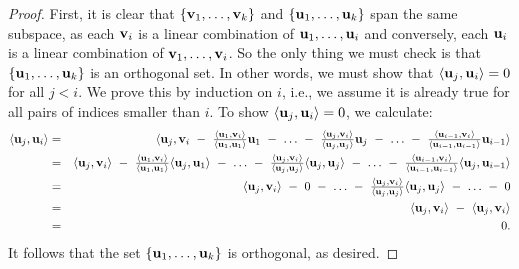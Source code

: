 \begin{proof}
  First, it is clear that $\set{\vect{v}_1,\ldots,\vect{v}_k}$ and
  $\set{\vect{u}_1,\ldots,\vect{u}_k}$ span the same subspace, as each
  $\vect{v}_i$ is a linear combination of
  $\vect{u}_1,\ldots,\vect{u}_i$ and conversely, each $\vect{u}_i$ is
  a linear combination of $\vect{v}_1,\ldots,\vect{v}_i$. So the only
  thing we must check is that $\set{\vect{u}_1,\ldots,\vect{u}_k}$ is
  an orthogonal set. In other words, we must show that
  $\iprod{\vect{u}_j,\vect{u}_i}=0$ for all $j<i$. We prove this by
  induction on $i$, i.e., we assume it is already true for all pairs
  of indices smaller than $i$. To show
  $\iprod{\vect{u}_j,\vect{u}_i}=0$, we calculate:
  \begin{eqnarray*}
    \iprod{\vect{u}_j,\vect{u}_i}
    &=& \textstyle
        \iprod{\vect{u}_j, \vect{v}_i
        ~-~ \frac{\iprod{\vect{u}_1,\vect{v}_i}}{\iprod{\vect{u}_1,\vect{u}_1}}\vect{u}_1
        ~-~ \ldots
        ~-~ \frac{\iprod{\vect{u}_j,\vect{v}_i}}{\iprod{\vect{u}_j,\vect{u}_j}}\vect{u}_j
        ~-~ \ldots
        ~-~ \frac{\iprod{\vect{u}_{i-1},\vect{v}_i}}{\iprod{\vect{u}_{i-1},\vect{u}_{i-1}}}\vect{u}_{i-1}}
    \\
    &=& \textstyle
        \iprod{\vect{u}_j, \vect{v}_i}
        ~-~ \frac{\iprod{\vect{u}_1,\vect{v}_i}}{\iprod{\vect{u}_1,\vect{u}_1}}\iprod{\vect{u}_j,\vect{u}_1}
        ~-~ \ldots
        ~-~ \frac{\iprod{\vect{u}_j,\vect{v}_i}}{\iprod{\vect{u}_j,\vect{u}_j}}\iprod{\vect{u}_j,\vect{u}_j}
        ~-~ \ldots
        ~-~ \frac{\iprod{\vect{u}_{i-1},\vect{v}_i}}{\iprod{\vect{u}_{i-1},\vect{u}_{i-1}}}\iprod{\vect{u}_j,\vect{u}_{i-1}}
    \\
    &=& \textstyle
        \iprod{\vect{u}_j, \vect{v}_i}
        ~-~ 0
        ~-~ \ldots
        ~-~ \frac{\iprod{\vect{u}_j,\vect{v}_i}}{\iprod{\vect{u}_j,\vect{u}_j}}\iprod{\vect{u}_j,\vect{u}_j}
        ~-~ \ldots
        ~-~ 0
    \\
    &=& \iprod{\vect{u}_j, \vect{v}_i}
        ~-~ \iprod{\vect{u}_j,\vect{v}_i}
    \\
    &=& 0.
  \end{eqnarray*}
  It follows that the set $\set{\vect{u}_1,\ldots,\vect{u}_k}$ is
  orthogonal, as desired.
\end{proof}

